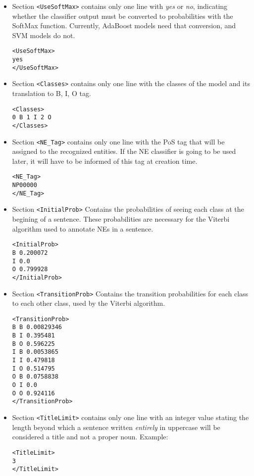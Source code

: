 \documentclass[a4paper]{book}
\begin{document}
\begin{itemize}
\item Section \verb#<UseSoftMax># contains only one line with {\em
  yes} or {\em no}, indicating whether the classifier output must be
  converted to probabilities with the SoftMax function. Currently,
  AdaBoost models need that conversion, and SVM models do not.
\begin{verbatim}
<UseSoftMax>
yes
</UseSoftMax>
\end{verbatim}

\item Section \verb#<Classes># contains only one line with the classes
  of the model and its translation to B, I, O tag.
\begin{verbatim}
<Classes>
0 B 1 I 2 O
</Classes>
\end{verbatim}

  \item Section \verb#<NE_Tag># contains only one line with the PoS tag that
  will be assigned to the recognized entities. If the NE classifier is
  going to be used later, it will have to be informed of this tag at
  creation time.
\begin{verbatim}
<NE_Tag>
NP00000
</NE_Tag>
\end{verbatim}

\item Section \verb#<InitialProb># Contains the probabilities of
  seeing each class at the begining of a sentence. These probabilities
  are necessary for the Viterbi algorithm used to annotate NEs in a
  sentence.
\begin{verbatim}
<InitialProb>
B 0.200072
I 0.0
O 0.799928
</InitialProb>
\end{verbatim}

\item Section \verb#<TransitionProb># Contains the transition
  probabilities for each class to each other class, used by the
  Viterbi algorithm.
\begin{verbatim}
<TransitionProb>
B B 0.00829346
B I 0.395481
B O 0.596225
I B 0.0053865
I I 0.479818
I O 0.514795
O B 0.0758838
O I 0.0
O O 0.924116
</TransitionProb>
\end{verbatim}


\item Section \verb#<TitleLimit># contains only one line with an integer
  value stating the length beyond which a sentence written {\sl
  entirely} in uppercase will be considered a title and not a proper
  noun. Example:
\begin{verbatim}
<TitleLimit>
3
</TitleLimit>
\end{verbatim}


\end{itemize}
\end{document}
